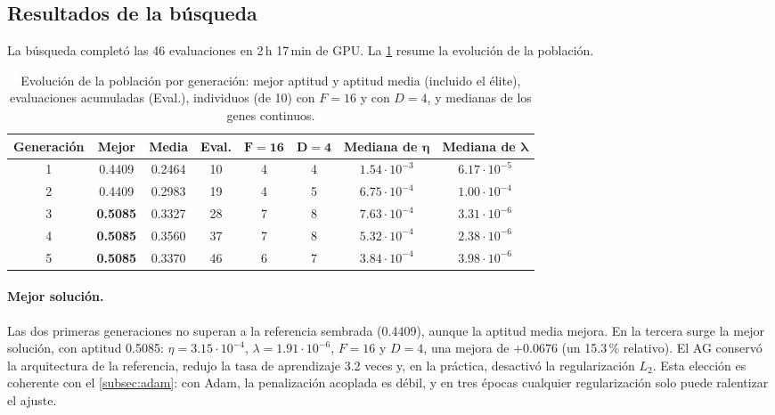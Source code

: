 \subsection{Resultados de la búsqueda}\label{subsec:resultados-ag}

La búsqueda completó las 46 evaluaciones en 2\,h 17\,min de GPU. La \cref{tab:generaciones} resume la evolución de la población.

\begin{table}[htbp]
  \centering
  \caption{Evolución de la población por generación: mejor aptitud y aptitud media (incluido el élite), evaluaciones acumuladas (Eval.), individuos (de 10) con $F=16$ y con $D=4$, y medianas de los genes continuos.}
  \label{tab:generaciones}
  \small
  \setlength{\tabcolsep}{4pt}
  \begin{tabular}{cccccccc}
    \toprule
    \textbf{Generación} & \textbf{Mejor} & \textbf{Media} & \textbf{Eval.} & $\bm{F=16}$ & $\bm{D=4}$ & \textbf{Mediana de} $\bm{\eta}$ & \textbf{Mediana de} $\bm{\lambda}$ \\
    \midrule
    1 & 0.4409 & 0.2464 & 10 & 4 & 4 & $1.54\cdot10^{-3}$ & $6.17\cdot10^{-5}$ \\
    2 & 0.4409 & 0.2983 & 19 & 4 & 5 & $6.75\cdot10^{-4}$ & $1.00\cdot10^{-4}$ \\
    3 & \textbf{0.5085} & 0.3327 & 28 & 7 & 8 & $7.63\cdot10^{-4}$ & $3.31\cdot10^{-6}$ \\
    4 & \textbf{0.5085} & 0.3560 & 37 & 7 & 8 & $5.32\cdot10^{-4}$ & $2.38\cdot10^{-6}$ \\
    5 & \textbf{0.5085} & 0.3370 & 46 & 6 & 7 & $3.84\cdot10^{-4}$ & $3.98\cdot10^{-6}$ \\
    \bottomrule
  \end{tabular}
\end{table}

\paragraph{Mejor solución.} Las dos primeras generaciones no superan a la referencia sembrada (0.4409), aunque la aptitud media mejora. En la tercera surge la mejor solución, con aptitud 0.5085: $\eta=3.15\cdot10^{-4}$, $\lambda=1.91\cdot10^{-6}$, $F=16$ y $D=4$, una mejora de $+0.0676$ (un 15.3\,\% relativo). El AG conservó la arquitectura de la referencia, redujo la tasa de aprendizaje 3.2 veces y, en la práctica, desactivó la regularización $L_2$. Esta elección es coherente con el \cref{subsec:adam}: con Adam, la penalización acoplada es débil, y en tres épocas cualquier regularización solo puede ralentizar el ajuste.

